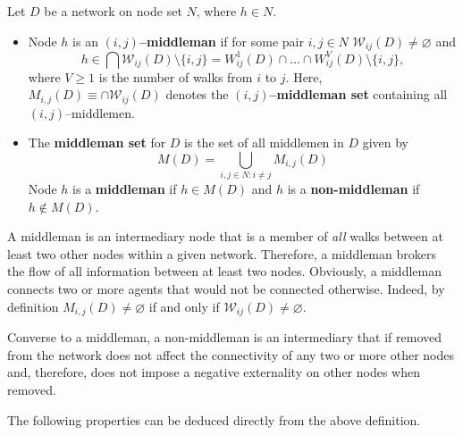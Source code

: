 \begin{definition}[Middleman] \label{middleman}
Let $D$ be a network on node set $N$, where $h \in N$.
\begin{itemize}
\item Node $h$ is an \textbf{$(i,j)$--middleman} if for some pair $i,j \in N$ $\mathcal{W}_{ij} (D) \neq \varnothing$ and
\begin{equation} \label{ijmiddleman}
h \in \bigcap \mathcal{W}_{ij}(D) \setminus \{i,j\} = W_{ij}^{1}(D) \cap  \ldots  \cap W_{ij}^{V}(D) \setminus \{i,j\},
\end{equation}
where $V \geqslant 1$ is the number of walks from $i$ to $j$. Here, $M_{i,j}(D) \equiv \cap \mathcal{W}_{ij}(D)$ denotes the \textbf{$(i,j)$--middleman set} containing all $(i,j)$--middlemen.

\item The \textbf{middleman set} for $D$ is the set of all middlemen in $D$ given by
\begin{equation} \label{middlemanseteq}
M(D) = \bigcup_{i,j \in N \colon i \neq j} M_{i,j}(D)
\end{equation}
Node $h$ is a \textbf{middleman} if $h \in M(D)$ and $h$ is a \textbf{non-middleman} if $h \notin M(D)$.
\end{itemize}
\end{definition}

A middleman is an intermediary node that is a member of \emph{all} walks between at least two other nodes within a given network. Therefore, a middleman brokers the flow of all information between at least two nodes. Obviously, a middleman connects two or more agents that would not be connected otherwise. Indeed, by definition $M_{i,j} (D) \neq \varnothing$ if and only if $\mathcal{W}_{ij} (D) \neq \varnothing$.

Converse to a middleman, a non-middleman is an intermediary that if removed from the network does not affect the connectivity of any two or more other nodes and, therefore, does not impose a negative externality on other nodes when removed.

The following properties can be deduced directly from the above definition.

